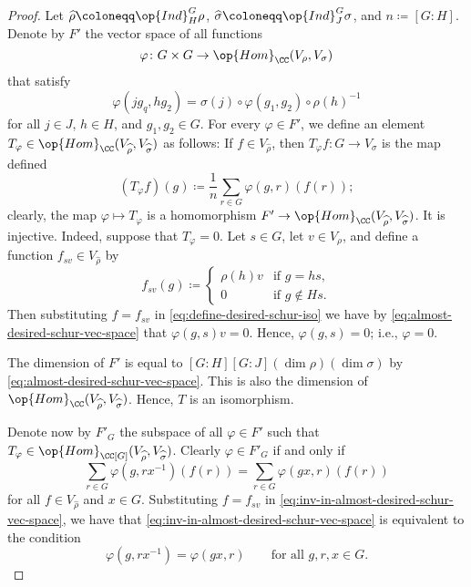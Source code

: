 \documentclass[../main.tex]{subfiles}
\begin{document}
\begin{proof}
	Let $\widehat\rho\coloneqq\op{Ind}^G_H\rho$, $\widehat\sigma\coloneqq\op{Ind}^G_J\sigma$, and $n\coloneqq[G:H]$. Denote by $F'$ the vector space of all functions
	\[\varphi\colon G\times G\to\op{Hom}_\CC(V_\rho,V_\sigma)\]
	that satisfy
	\begin{equation}
		\varphi(jg_q,hg_2) = \sigma(j)\circ\varphi(g_1,g_2)\circ\rho(h)^{-1} \label{eq:almost-desired-schur-vec-space}
	\end{equation}
	for all $j\in J$, $h\in H$, and $g_1,g_2\in G$. For every $\varphi\in F'$, we define an element $T_\varphi\in\op{Hom}_\CC(V_{\widehat\rho},V_{\widehat\sigma})$ as follows: If $f\in V_{\widehat\rho}$, then $T_\varphi f\colon G\to V_\sigma$ is the map defined
	\begin{equation}
		(T_\varphi f)(g)\coloneqq\frac1n\sum_{r\in G}\varphi(g,r)(f(r)); \label{eq:define-desired-schur-iso}
	\end{equation}
	clearly, the map $\varphi\mapsto T_\varphi$ is a homomorphism $F'\to\op{Hom}_\CC(V_{\widehat\rho},V_{\widehat\sigma})$. It is injective. Indeed, suppose that $T_\varphi=0$. Let $s\in G$, let $v\in V_\rho$, and define a function $f_{sv}\in V_{\widehat\rho}$ by
	\[f_{sv}(g)\coloneqq\begin{cases}
		\rho(h)v & \text{if }g=hs, \\
		0 & \text{if }g\notin Hs.
	\end{cases}\]
	Then substituting $f=f_{sv}$ in \eqref{eq:define-desired-schur-iso} we have by \eqref{eq:almost-desired-schur-vec-space} that $\varphi(g,s)v=0$. Hence, $\varphi(g,s)=0$; i.e., $\varphi=0$.

	The dimension of $F'$ is equal to $[G:H][G:J](\dim\rho)(\dim\sigma)$ by \eqref{eq:almost-desired-schur-vec-space}. This is also the dimension of $\op{Hom}_\CC(V_{\widehat\rho},V_{\widehat\sigma})$. Hence, $T$ is an isomorphism.

	Denote now by $F'_G$ the subspace of all $\varphi\in F'$ such that $T_\varphi\in\op{Hom}_{\CC[G]}(V_{\widehat\rho},V_{\widehat\sigma})$. Clearly $\varphi\in F'_G$ if and only if
	\begin{equation}
		\sum_{r\in G}\varphi\left(g,rx^{-1}\right)(f(r))=\sum_{r\in G}\varphi(gx,r)(f(r)) \label{eq:inv-in-almost-desired-schur-vec-space}
	\end{equation}
	for all $f\in V_{\widehat\rho}$ and $x\in G$. Substituting $f=f_{sv}$ in \eqref{eq:inv-in-almost-desired-schur-vec-space}, we have that \eqref{eq:inv-in-almost-desired-schur-vec-space} is equivalent to the condition
	\begin{equation}
		\varphi\left(g,rx^{-1}\right)=\varphi(gx,r)\qquad\text{for all }g,r,x\in G. \label{eq:better-inv-in-almost-desired-schur-vec-space}
	\end{equation}


\end{proof}
\end{document}

